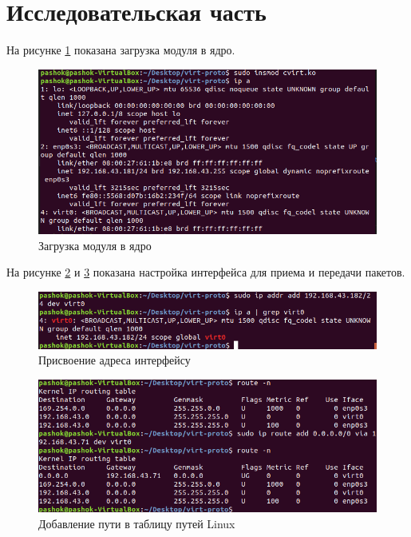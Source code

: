 \documentclass[14pt, a4paper]{extarticle}
\begin{document}
\section{Исследовательская часть}
На рисунке \ref{load} показана загрузка модуля в ядро.

\begin{figure}[H]
	\centering
	\includegraphics[scale=0.8]{load.png}
	\caption{Загрузка модуля в ядро}
	\label{load}
\end{figure}

На рисунке \ref{sett} и \ref{sett_route} показана настройка интерфейса для приема и передачи пакетов.

\begin{figure}[H]
	\centering
	\includegraphics[scale=0.8]{sett.png}
	\caption{Присвоение адреса интерфейсу}
	\label{sett}
\end{figure}

\begin{figure}[H]
	\centering
	\includegraphics[scale=0.8]{sett_route.png}
	\caption{Добавление пути в таблицу путей Linux}
	\label{sett_route}
\end{figure}
\end{document}
